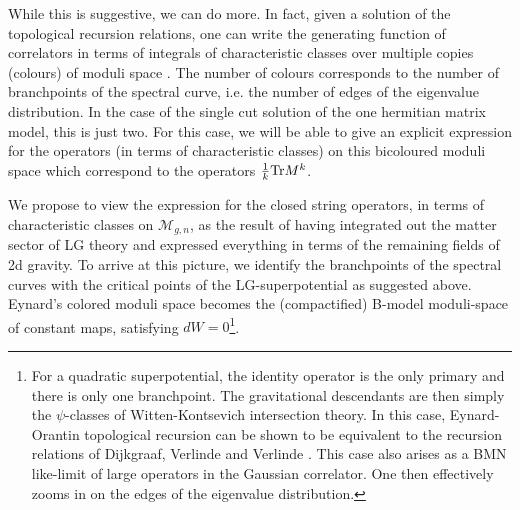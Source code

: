 \documentclass[english]{article}
\let\mc=\mathcal
\begin{document}
While this is suggestive, we can do more. 
In fact, given a solution of the topological recursion relations, one can write the generating function of 
correlators in terms of integrals of characteristic classes over multiple  copies (colours) of moduli space \cite{eynard1bp,eynard2bp}. The number of colours corresponds to the number of branchpoints of the spectral curve, i.e. the number of edges of the eigenvalue distribution. In the case of the single cut solution of the one hermitian matrix model, this is just two. For this case, we will be able to give an explicit expression for the operators (in terms of characteristic classes) on this bicoloured moduli space which correspond to the operators 
$\frac{1}{k}{\rm Tr}M^k$. 

We propose to view the expression for the closed string operators, in terms of characteristic classes on $\mc{M}_{g,n}$, as the result of having integrated out the matter sector of LG theory and expressed everything in terms of the remaining fields of 2d gravity. To arrive at this picture, we identify the branchpoints of the spectral curves with the critical points of the LG-superpotential as suggested above. Eynard's colored moduli space becomes the (compactified) B-model moduli-space of constant maps, satisfying $dW=0$\footnote{For a quadratic superpotential, the identity operator is the only primary and there is only one branchpoint. The gravitational descendants are then simply the $\psi$-classes of Witten-Kontsevich intersection theory. In this case, Eynard-Orantin topological recursion can be shown to be equivalent to the recursion relations of Dijkgraaf, Verlinde and Verlinde \cite{dijkgraaf1991topological}. This case also arises as a BMN like-limit of large operators in the Gaussian correlator. One then effectively zooms in on the edges of the eigenvalue distribution.}. 

\end{document}
